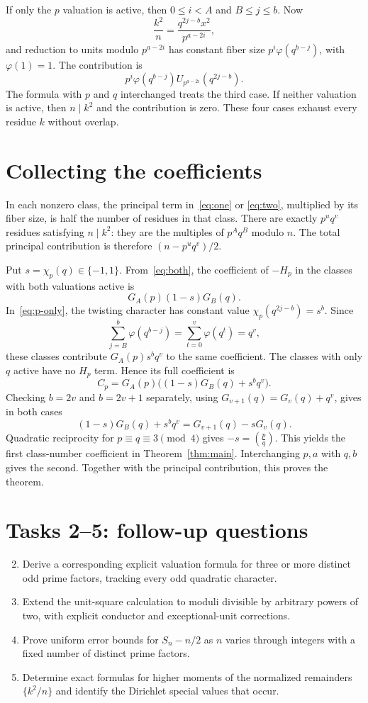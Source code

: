 \documentclass[11pt]{article}
\newcommand{\leg}[2]{\left(\frac{#1}{#2}\right)}
\begin{document}
If only the $p$ valuation is active, then $0\le i<A$ and $B\le j\le b$.
Now
\[
 \frac{k^2}{n}=\frac{q^{2j-b}x^2}{p^{a-2i}},
\]
and reduction to units modulo $p^{a-2i}$ has constant fiber size
$p^i\varphi(q^{b-j})$, with $\varphi(1)=1$. The contribution is
\begin{equation}\label{eq:p-only}
 p^i\varphi(q^{b-j})U_{p^{a-2i}}(q^{2j-b}).
\end{equation}
The formula with $p$ and $q$ interchanged treats the third case. If
neither valuation is active, then $n\mid k^2$ and the contribution is zero.
These four cases exhaust every residue $k$ without overlap.

\section*{Collecting the coefficients}
In each nonzero class, the principal term in~\eqref{eq:one} or
\eqref{eq:two}, multiplied by its fiber size, is half the number of
residues in that class. There are exactly $p^u q^v$ residues satisfying
$n\mid k^2$: they are the multiples of $p^Aq^B$ modulo $n$.
The total principal contribution is therefore $(n-p^u q^v)/2$.

Put $s=\chi_p(q)\in\{-1,1\}$. From~\eqref{eq:both}, the coefficient
of $-H_p$ in the classes with both valuations active is
\[
 G_A(p)(1-s)G_B(q).
\]
In~\eqref{eq:p-only}, the twisting character has constant value
$\chi_p(q^{2j-b})=s^b$. Since
\[
 \sum_{j=B}^{b}\varphi(q^{b-j})
 =\sum_{t=0}^{v}\varphi(q^t)=q^v,
\]
these classes contribute $G_A(p)s^b q^v$ to the same coefficient.
The classes with only $q$ active have no $H_p$ term. Hence its full
coefficient is
\[
 C_p=G_A(p)\big((1-s)G_B(q)+s^b q^v\big).
\]
Checking $b=2v$ and $b=2v+1$ separately, using
$G_{v+1}(q)=G_v(q)+q^v$, gives in both cases
\[
 (1-s)G_B(q)+s^b q^v=G_{v+1}(q)-sG_v(q).
\]
Quadratic reciprocity for $p\equiv q\equiv3\pmod4$ gives
$-s=\leg pq$. This yields the first class-number coefficient in
Theorem~\ref{thm:main}. Interchanging $p,a$ with $q,b$ gives the second.
Together with the principal contribution, this proves the theorem.

\section*{Tasks 2--5: follow-up questions}
\begin{enumerate}\setcounter{enumi}{1}
\item Derive a corresponding explicit valuation formula for three or more
distinct odd prime factors, tracking every odd quadratic character.
\item Extend the unit-square calculation to moduli divisible by arbitrary
powers of two, with explicit conductor and exceptional-unit corrections.
\item Prove uniform error bounds for $S_n-n/2$ as $n$ varies through
integers with a fixed number of distinct prime factors.
\item Determine exact formulas for higher moments of the normalized
remainders $\{k^2/n\}$ and identify the Dirichlet special values that occur.
\end{enumerate}
\end{document}
